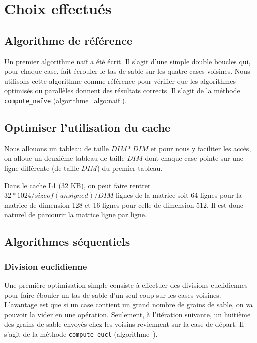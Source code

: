 \section {Choix effectués}

\subsection{Algorithme de référence}

Un premier algorithme naïf a été écrit. Il s'agit d'une simple double
boucles qui, pour chaque case, fait écrouler le tas de sable sur les
quatre cases voisines.  Nous utilisons cette algorithme comme
référence pour vérifier que les algorithmes optimisés ou parallèles
donnent des résultats corrects. Il s'agit de la méthode
\texttt{compute\_naïve} (algorithme~\ref{algo:naif}).
\medskip

\subsection{Optimiser l'utilisation du cache}
\label{sec:cache}

Nous allouons un tableau de taille $DIM*DIM$ et pour nous y faciliter les
accès, on alloue un deuxième tableau de taille $DIM$ dont chaque case
pointe sur une ligne différente (de taille $DIM$) du premier tableau.

Dans le cache L1 (32 KB), on peut faire rentrer
$32*1024/sizeof(unsigned)/DIM$ lignes de la matrice soit 64 lignes
pour la matrice de dimension 128 et 16 lignes pour celle de dimension
512. Il est donc naturel de parcourir la matrice ligne par ligne.

\subsection{Algorithmes séquentiels}

\subsubsection{Division euclidienne}

Une première optimisation simple consiste à effectuer des divisions
euclidiennes pour faire ébouler un tas de sable d'un seul coup sur les
cases voisines. L'avantage est que si un case contient un grand nombre
de grains de sable, on va pouvoir la vider en une
opération. Seulement, à l'itération suivante, un huitième des grains
de sable envoyés chez les voisins reviennent sur la case de départ.
Il s'agit de la méthode \texttt{compute\_eucl} (algorithme~).
\medskip

